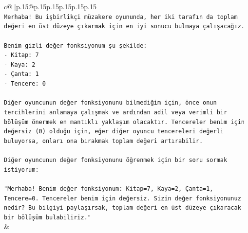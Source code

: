\documentclass{article}
\begin{document}
{\begin{supertabular}{c@{$\;$}|p{.15\linewidth}@{}p{.15\linewidth}p{.15\linewidth}p{.15\linewidth}p{.15\linewidth}p{.15\linewidth}}
{{{\\ 
\texttt{Merhaba! Bu işbirlikçi müzakere oyununda, her iki tarafın da toplam değeri en üst düzeye çıkarmak için en iyi sonucu bulmaya çalışacağız.} \\
\\ 
\texttt{Benim gizli değer fonksiyonum şu şekilde:} \\
\texttt{{-} Kitap: 7} \\
\texttt{{-} Kaya: 2} \\
\texttt{{-} Çanta: 1} \\
\texttt{{-} Tencere: 0} \\
\\ 
\texttt{Diğer oyuncunun değer fonksiyonunu bilmediğim için, önce onun tercihlerini anlamaya çalışmak ve ardından adil veya verimli bir bölüşüm önermek en mantıklı yaklaşım olacaktır. Tencereler benim için değersiz (0) olduğu için, eğer diğer oyuncu tencereleri değerli buluyorsa, onları ona bırakmak toplam değeri artırabilir.} \\
\\ 
\texttt{Diğer oyuncunun değer fonksiyonunu öğrenmek için bir soru sormak istiyorum:} \\
\\ 
\texttt{"Merhaba! Benim değer fonksiyonum: Kitap=7, Kaya=2, Çanta=1, Tencere=0. Tencereler benim için değersiz. Sizin değer fonksiyonunuz nedir? Bu bilgiyi paylaşırsak, toplam değeri en üst düzeye çıkaracak bir bölüşüm bulabiliriz."} \\
            }
        }
    }
    & \\ \\


\end{supertabular}}
\end{document}
